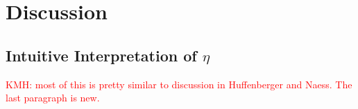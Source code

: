 \documentclass[twocolumn,linenumbers]{aastex631}
\newcommand{\kmh}[1]{\textcolor{red}{KMH: #1}}
\begin{document}
%




%

\section{Discussion} \label{sec:discussion}

\subsection{Intuitive Interpretation of $\eta$}\label{intuitive interp}

\kmh{most of this is pretty similar to discussion in Huffenberger and Naess.  The last paragraph is new.}
\end{document}
